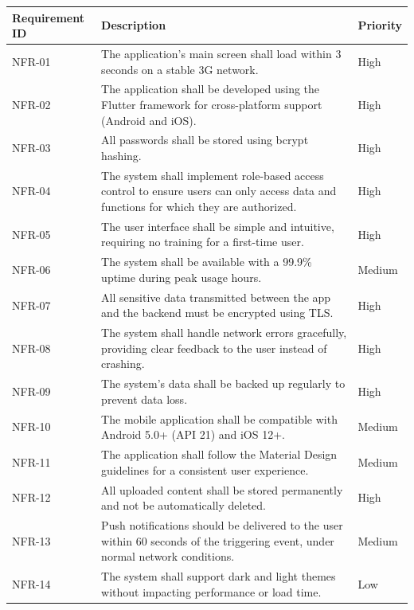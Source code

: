\documentclass[12pt,a4paper]{article}
\newcommand{\THH}[1]{\small\bfseries\color{white} #1}
\begin{document}
\vspace{0.4em}
\begin{longtable}{|>{\centering\arraybackslash}p{2cm}|p{10cm}|>{\centering\arraybackslash}p{2cm}|}
\hline
\rowcolor{navyblue}
\THH{Requirement ID} & \THH{Description} & \THH{Priority} \\
\hline
\endhead
NFR-01 & The application's main screen shall load within 3 seconds on a stable 3G network. & High \\
NFR-02 & The application shall be developed using the Flutter framework for cross-platform support (Android and iOS). & High \\
NFR-03 & All passwords shall be stored using bcrypt hashing. & High \\
NFR-04 & The system shall implement role-based access control to ensure users can only access data and functions for which they are authorized. & High \\
NFR-05 & The user interface shall be simple and intuitive, requiring no training for a first-time user. & High \\
NFR-06 & The system shall be available with a 99.9\% uptime during peak usage hours. & Medium \\
NFR-07 & All sensitive data transmitted between the app and the backend must be encrypted using TLS. & High \\
NFR-08 & The system shall handle network errors gracefully, providing clear feedback to the user instead of crashing. & High \\
NFR-09 & The system's data shall be backed up regularly to prevent data loss. & High \\
NFR-10 & The mobile application shall be compatible with Android 5.0+ (API 21) and iOS 12+. & Medium \\
NFR-11 & The application shall follow the Material Design guidelines for a consistent user experience. & Medium \\
NFR-12 & All uploaded content shall be stored permanently and not be automatically deleted. & High \\
NFR-13 & Push notifications should be delivered to the user within 60 seconds of the triggering event, under normal network conditions. & Medium \\
NFR-14 & The system shall support dark and light themes without impacting performance or load time. & Low \\
\hline
\end{longtable}
\newpage
\end{document}
